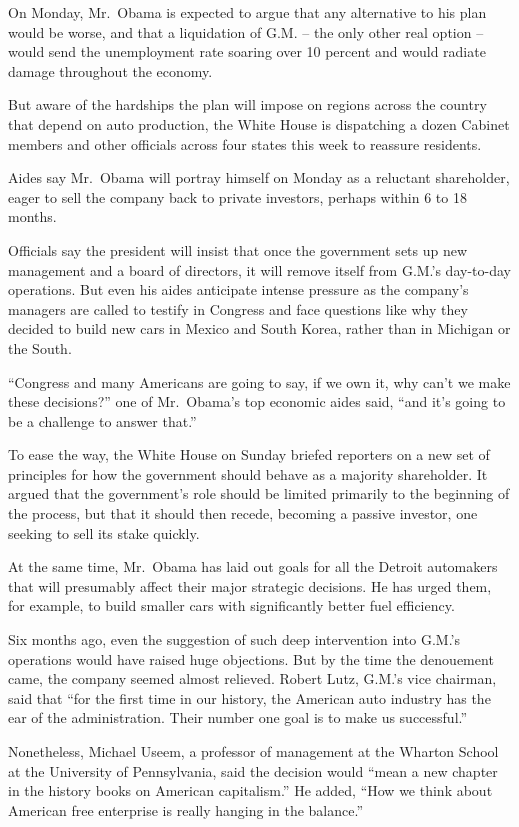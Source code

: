 \documentclass[12pt,a4paper,onecolumn]{article}
\begin{document}
On Monday, Mr.~Obama is expected to argue that any alternative to his plan would be worse, and that
a liquidation of G.M. -- the only other real option -- would send the unemployment rate soaring over
10 percent and would radiate damage throughout the economy.

But aware of the hardships the plan will impose on regions across the country that depend on auto
production, the White House is dispatching a dozen Cabinet members and other officials across four
states this week to reassure residents.

Aides say Mr.~Obama will portray himself on Monday as a reluctant shareholder, eager to sell the
company back to private investors, perhaps within 6 to 18 months.

Officials say the president will insist that once the government sets up new management and a board
of directors, it will remove itself from G.M.'s day-to-day operations. But even his aides anticipate
intense pressure as the company's managers are called to testify in Congress and face questions like
why they decided to build new cars in Mexico and South Korea, rather than in Michigan or the South.

``Congress and many Americans are going to say, if we own it, why can't we make these decisions?''
one of Mr.~Obama's top economic aides said, ``and it's going to be a challenge to answer that.''

To ease the way, the White House on Sunday briefed reporters on a new set of principles for how the
government should behave as a majority shareholder. It argued that the government's role should be
limited primarily to the beginning of the process, but that it should then recede, becoming a
passive investor, one seeking to sell its stake quickly.

At the same time, Mr.~Obama has laid out goals for all the Detroit automakers that will presumably
affect their major strategic decisions. He has urged them, for example, to build smaller cars with
significantly better fuel efficiency.

Six months ago, even the suggestion of such deep intervention into G.M.'s operations would have
raised huge objections. But by the time the denouement came, the company seemed almost relieved.
Robert Lutz, G.M.'s vice chairman, said that ``for the first time in our history, the American auto
industry has the ear of the administration. Their number one goal is to make us successful.''

Nonetheless, Michael Useem, a professor of management at the Wharton School at the University of
Pennsylvania, said the decision would ``mean a new chapter in the history books on American
capitalism.'' He added, ``How we think about American free enterprise is really hanging in the
balance.''
\end{document}
